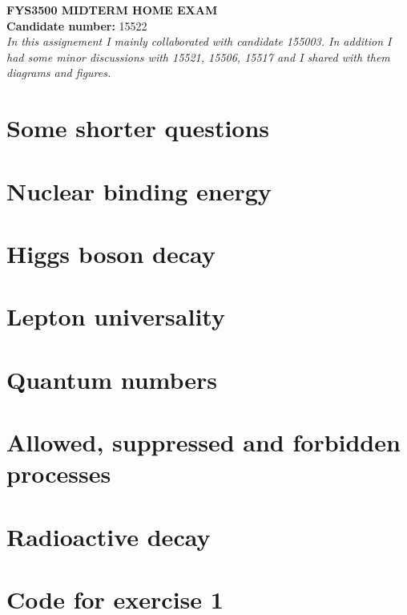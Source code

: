 \documentclass[]{article}
\begin{document}
\begin{center}
    \textbf{\LARGE FYS3500 MIDTERM HOME EXAM} \\
    \vspace{15pt}
    \textbf{Candidate number: } 15522 \\
    \vspace{15pt}
    \textit{In this assignement I mainly collaborated with candidate 155003. In addition I had some minor
    discussions with 15521, 15506, 15517 and I shared with them diagrams and figures.}
\end{center}

\vspace{30pt}

\section{Some shorter questions}


\section{Nuclear binding energy}


\section{Higgs boson decay}


\section{Lepton universality}


\section{Quantum numbers}


\section{Allowed, suppressed and forbidden processes}


\section{Radioactive decay}


\section{Code for exercise 1}

\end{document}
